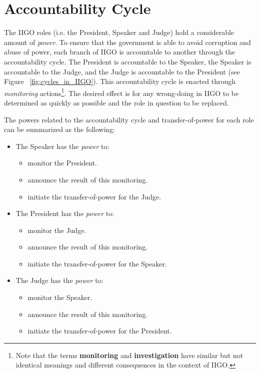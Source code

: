 \section{Accountability Cycle}
\label{sec:accountability}

The IIGO roles (i.e. the President, Speaker and Judge) hold a considerable amount of \emph{power}. To ensure that the government is able to avoid corruption and abuse of power, each branch of IIGO is accountable to another through the accountability cycle. 
The President is accountable to the Speaker, the Speaker is accountable to the Judge, and the Judge is accountable to the President (see Figure~ \ref{fig:cycles_in_IIGO}). This accountability cycle is enacted through \emph{monitoring} actions\footnote{Note that the terms \textbf{monitoring} and \textbf{investigation} have similar but not identical meanings and different consequences in the context of IIGO.}. The desired effect is for any wrong-doing in IIGO to be determined as quickly as possible and the role in question to be replaced. 

The powers related to the accountability cycle and transfer-of-power for each role can be summarized as the following: 
\begin{itemize}
    \item The Speaker has the \emph{power} to: 
    \begin{itemize}
        \item monitor the President.
        \item announce the result of this monitoring.
        \item initiate the transfer-of-power for the Judge.
    \end{itemize}
    \item The President has the \emph{power} to: 
    \begin{itemize}
        \item monitor the Judge.
        \item announce the result of this monitoring.
        \item initiate the transfer-of-power for the Speaker.
    \end{itemize}
    \item The Judge has the \emph{power} to: 
    \begin{itemize}
        \item  monitor the Speaker.
        \item announce the result of this monitoring.
        \item initiate the transfer-of-power for the President.
    \end{itemize}
\end{itemize}

